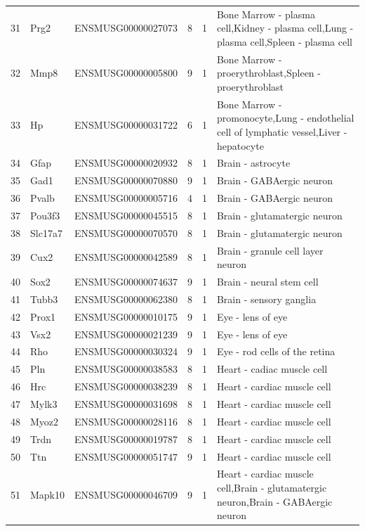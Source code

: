 \begin{table}[ht]
{\begin{tabular}{lllrrl}
        31 & Prg2 & ENSMUSG00000027073 & 8 & 1 & Bone Marrow - plasma cell,Kidney - plasma cell,Lung - plasma cell,Spleen - plasma cell \\
        32 & Mmp8 & ENSMUSG00000005800 & 9 & 1 & Bone Marrow - proerythroblast,Spleen - proerythroblast \\
        33 & Hp & ENSMUSG00000031722 & 6 & 1 & Bone Marrow - promonocyte,Lung - endothelial cell of lymphatic vessel,Liver - hepatocyte \\
        34 & Gfap & ENSMUSG00000020932 & 8 & 1 & Brain - astrocyte \\
        35 & Gad1 & ENSMUSG00000070880 & 9 & 1 & Brain - GABAergic neuron \\
        36 & Pvalb & ENSMUSG00000005716 & 4 & 1 & Brain - GABAergic neuron \\
        37 & Pou3f3 & ENSMUSG00000045515 & 8 & 1 & Brain - glutamatergic neuron \\
        38 & Slc17a7 & ENSMUSG00000070570 & 8 & 1 & Brain - glutamatergic neuron \\
        39 & Cux2 & ENSMUSG00000042589 & 8 & 1 & Brain - granule cell layer neuron \\
        40 & Sox2 & ENSMUSG00000074637 & 9 & 1 & Brain - neural stem cell \\
        41 & Tubb3 & ENSMUSG00000062380 & 8 & 1 & Brain - sensory ganglia \\
        42 & Prox1 & ENSMUSG00000010175 & 9 & 1 & Eye - lens of eye \\
        43 & Vsx2 & ENSMUSG00000021239 & 9 & 1 & Eye - lens of eye \\
        44 & Rho & ENSMUSG00000030324 & 9 & 1 & Eye - rod cells of the retina \\
        45 & Pln & ENSMUSG00000038583 & 8 & 1 & Heart - cadiac muscle cell \\
        46 & Hrc & ENSMUSG00000038239 & 8 & 1 & Heart - cardiac muscle cell \\
        47 & Mylk3 & ENSMUSG00000031698 & 8 & 1 & Heart - cardiac muscle cell \\
        48 & Myoz2 & ENSMUSG00000028116 & 8 & 1 & Heart - cardiac muscle cell \\
        49 & Trdn & ENSMUSG00000019787 & 8 & 1 & Heart - cardiac muscle cell \\
        50 & Ttn & ENSMUSG00000051747 & 9 & 1 & Heart - cardiac muscle cell \\
        51 & Mapk10 & ENSMUSG00000046709 & 9 & 1 & Heart - cardiac muscle cell,Brain - glutamatergic neuron,Brain - GABAergic neuron \\

\end{tabular}}
\end{table}
